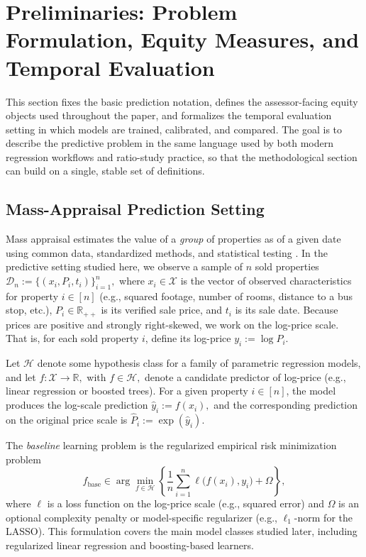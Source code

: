 \documentclass[12pt, draft]{article}
\theoremstyle{plain}
\theoremstyle{definition}
\newcommand{\1}{\mathbf{1}}
\renewcommand{\H}{\mathcal{H}}
\begin{document}
\section{Preliminaries: Problem Formulation, Equity Measures, and Temporal Evaluation}
\label{sec:problem_setting}

This section fixes the basic prediction notation, defines the assessor-facing equity objects used throughout the paper, and formalizes the temporal evaluation setting in which models are trained, calibrated, and compared. The goal is to describe the predictive problem in the same language used by both modern regression workflows and ratio-study practice, so that the methodological section can build on a single, stable set of definitions.

\subsection{Mass-Appraisal Prediction Setting}
\label{subsec:prediction_setting}

Mass appraisal estimates the value of a \emph{group} of properties as of a given date using common data, standardized methods, and statistical testing \cite{IAAO2025Mass}. In the predictive setting studied here, we observe a sample of $n$ sold properties
$
\mathcal{D}_n := \{(x_i,P_i,t_i)\}_{i=1}^n,
$
where $x_i \in \mathcal{X}$ is the vector of observed characteristics for property $i \in [n]$ (e.g., squared footage, number of rooms, distance to a bus stop, etc.), $P_i \in \mathbb{R}_{++}$ is its verified sale price, and $t_i$ is its sale date. Because prices are positive and strongly right-skewed, we work on the log-price scale. That is, for each sold property $i$, define its log-price
$
y_i := \log P_i.
$

Let $\H$ denote some hypothesis class for a family of parametric regression models, and let
$
f:\mathcal{X}\to\mathbb{R},
$ with $ f \in \H,
$
denote a candidate predictor of log-price (e.g., linear regression or boosted trees). For a given property $i\in [n]$, the model produces the log-scale prediction
$
\hat y_i := f(x_i),
$
and the corresponding prediction on the original price scale is
$
\widehat P_i := \exp(\hat y_i).
$ 

The \textit{baseline} learning problem is the regularized empirical risk minimization problem
\begin{equation}
\label{eq:baseline_erm}
f_\mathrm{base}
\in
\arg\min_{f\in\H}
\left\{
\frac{1}{n}\sum_{i=1}^n \ell\big(f(x_i),y_i\big)
+
\Omega
\right\}
,
\end{equation}
where $\ell$ is a loss function on the log-price scale (e.g., squared error) and $\Omega$ is an optional complexity penalty or model-specific regularizer (e.g., $\ell_1$-norm for the LASSO). This formulation covers the main model classes studied later, including regularized linear regression and boosting-based learners.
\end{document}
